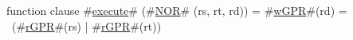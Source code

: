 function clause #\hyperref[zexecute]{execute}# (#\hyperref[zNOR]{NOR}# (rs, rt, rd)) =
  {
    #\hyperref[zwGPR]{wGPR}#(rd) = ~(#\hyperref[zrGPR]{rGPR}#(rs) | #\hyperref[zrGPR]{rGPR}#(rt))
  }

